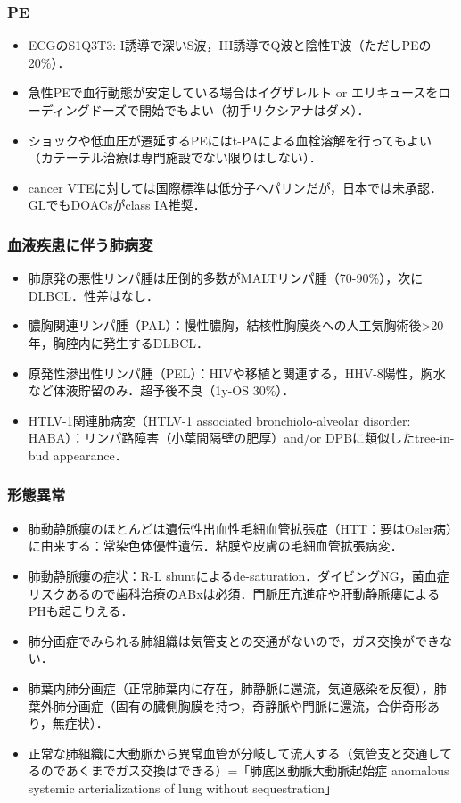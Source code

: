 \subsubsection{PE}

\begin{itemize}
\item ECGのS1Q3T3: I誘導で深いS波，III誘導でQ波と陰性T波（ただしPEの20\%）．
\item 急性PEで血行動態が安定している場合はイグザレルト or エリキュースをローディングドーズで開始でもよい（初手リクシアナはダメ）．
\item ショックや低血圧が遷延するPEにはt-PAによる血栓溶解を行ってもよい（カテーテル治療は専門施設でない限りはしない）．
\item cancer VTEに対しては国際標準は低分子ヘパリンだが，日本では未承認．GLでもDOACsがclass IA推奨．
\end{itemize}


\subsubsection{血液疾患に伴う肺病変}

\begin{itemize}
\item 肺原発の悪性リンパ腫は圧倒的多数がMALTリンパ腫（70-90\%），次にDLBCL．性差はなし．
\item 膿胸関連リンパ腫（PAL）：慢性膿胸，結核性胸膜炎への人工気胸術後>20年，胸腔内に発生するDLBCL．
\item 原発性滲出性リンパ腫（PEL）：HIVや移植と関連する，HHV-8陽性，胸水など体液貯留のみ．超予後不良（1y-OS 30\%）．
\item HTLV-1関連肺病変（HTLV-1 associated bronchiolo-alveolar disorder: HABA）：リンパ路障害（小葉間隔壁の肥厚）and/or DPBに類似したtree-in-bud appearance．

\end{itemize}


\subsubsection{形態異常}

\begin{itemize}
\item 肺動静脈瘻のほとんどは遺伝性出血性毛細血管拡張症（HTT：要はOsler病）に由来する：常染色体優性遺伝．粘膜や皮膚の毛細血管拡張病変．
\item 肺動静脈瘻の症状：R-L shuntによるde-saturation．ダイビングNG，菌血症リスクあるので歯科治療のABxは必須．門脈圧亢進症や肝動静脈瘻によるPHも起こりえる．
\item 肺分画症でみられる肺組織は気管支との交通がないので，ガス交換ができない．
\item 肺葉内肺分画症（正常肺葉内に存在，肺静脈に還流，気道感染を反復），肺葉外肺分画症（固有の臓側胸膜を持つ，奇静脈や門脈に還流，合併奇形あり，無症状）．
\item 正常な肺組織に大動脈から異常血管が分岐して流入する（気管支と交通してるのであくまでガス交換はできる）=「肺底区動脈大動脈起始症 anomalous systemic arterializations of lung without sequestration」
\end{itemize}


